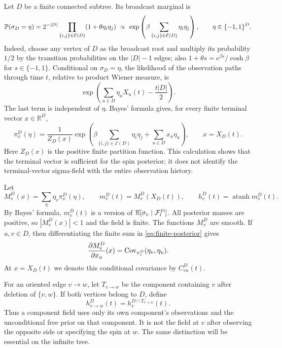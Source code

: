 Let \(D\) be a finite connected subtree.  Its broadcast marginal is
\[
 \P(\sigma_D=\eta)
   =2^{-|D|}\prod_{\{i,j\}\in\mathcal E(D)}
                (1+\theta\eta_i\eta_j)
   \ \propto\
     \exp\left(\beta\sum_{\{i,j\}\in\mathcal E(D)}
                              \eta_i\eta_j\right),
 \qquad \eta\in\{-1,1\}^D.
\]
Indeed, choose any vertex of \(D\) as the broadcast root and multiply
its probability \(1/2\) by the transition probabilities on the
\(|D|-1\) edges; also
\(1+\theta s=e^{\beta s}/\cosh\beta\) for \(s\in\{-1,1\}\).
Conditional on \(\sigma_D=\eta\), the likelihood of the observation
paths through time \(t\), relative to product Wiener measure, is
\[
 \exp\left(\sum_{u\in D}\eta_uX_u(t)-\frac{t|D|}{2}\right).
\]
The last term is independent of \(\eta\).  Bayes' formula gives, for
every finite terminal vector \(x\in\mathbb R^D\),
\begin{equation}
\label{eq:finite-posterior}
 \pi_x^D(\eta)
  =\frac{1}{Z_D(x)}
     \exp\left(
       \beta\sum_{\{i,j\}\in\mathcal E(D)}\eta_i\eta_j
       +\sum_{u\in D}x_u\eta_u\right),
 \qquad x=X_D(t).
\end{equation}
Here \(Z_D(x)\) is the positive finite partition function.  This
calculation shows that the terminal vector is sufficient for the spin
posterior; it does not identify the terminal-vector sigma-field with
the entire observation history.

Let
\[
 M_v^D(x)=\sum_\eta\eta_v\pi_x^D(\eta),\qquad
 m_v^D(t)=M_v^D(X_D(t)),\qquad
 h_v^D(t)=\operatorname{atanh}m_v^D(t).
\]
By Bayes' formula, \(m_v^D(t)\) is a version of
\(\E[\sigma_v\mid\mathcal F_t^D]\).  All posterior masses are positive,
so \(|M_v^D(x)|<1\) and the field is finite.  The functions \(M_v^D\)
are smooth.  If \(u,v\in D\), then
differentiating the finite sum in \eqref{eq:finite-posterior} gives
\begin{equation}
\label{eq:finite-posterior-derivative}
 \frac{\partial M_v^D}{\partial x_u}(x)
   =\Cov_{\pi_x^D}(\eta_v,\eta_u).
\end{equation}
At \(x=X_D(t)\) we denote this conditional covariance by \(C_{vu}^D(t)\).

For an oriented edge \(v\to w\), let \(T_{v\to w}\) be the component
containing \(v\) after deletion of \(\{v,w\}\).  If both vertices belong
to \(D\), define
\[
 h_{v\to w}^D(t)=h_v^{D\cap T_{v\to w}}(t).
\]
Thus a component field uses only its own component's observations and
the unconditional free prior on that component.  It is not the field at
\(v\) after observing the opposite side or specifying the spin at \(w\).
The same distinction will be essential on the infinite tree.

